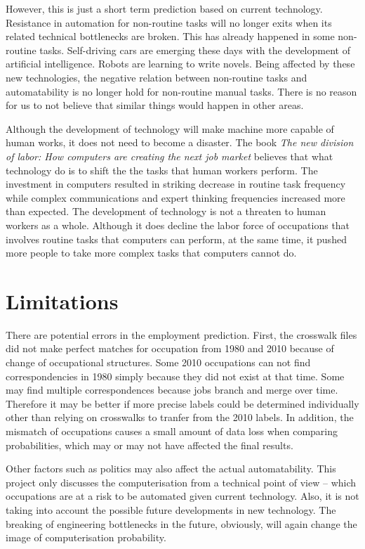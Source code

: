\documentclass[11pt]{report}
\numberwithin{equation}{chapter}
\begin{document}
\begin{spacing}{2}
However, this is just a short term prediction based on current technology. Resistance in automation for non-routine tasks will no longer exits when its related technical bottlenecks are broken.  This has already happened in some non-routine tasks. Self-driving cars are emerging these days with the development of artificial intelligence. Robots are learning to write novels. Being affected by these new technologies, the negative relation between non-routine tasks and automatability is no longer hold for non-routine manual tasks. There is no reason for us to not believe that similar things would happen in other areas. 

Although the development of technology will make machine more capable of human works, it does not need to become a disaster. The book \textit{The new division of labor: How computers are creating the next job market}\cite{levy2012new} believes that what technology do is to shift the the tasks that human workers perform. The investment in computers resulted in striking decrease in routine task frequency while complex communications and expert thinking frequencies increased more than expected. The development of technology is not a threaten to human workers as a whole. Although it does decline the labor force of occupations that involves routine tasks that computers can perform, at the same time, it pushed more people to take more complex tasks that computers cannot do. 



\section{Limitations}
There are potential errors in the employment prediction. First, the crosswalk files did not make perfect matches for occupation from 1980 and 2010 because of change of occupational structures. Some 2010 occupations can not find correspondencies in 1980 simply because they did not exist at that time. Some may find multiple correspondences because jobs branch and merge over time. Therefore it may be better if more precise labels could be determined individually other than relying on crosswalks to tranfer from the 2010 labels. In addition, the mismatch of occupations causes a small amount of data loss when comparing probabilities, which may or may not have affected the final results.  

Other factors such as politics may also affect the actual automatability. This project only discusses the computerisation from a technical point of view -- which occupations are at a risk to be automated given current technology. Also, it is not taking into account the possible future developments in new technology. The breaking of engineering bottlenecks in the future, obviously, will again change the image of computerisation probability. 




\end{spacing}
\end{document}
